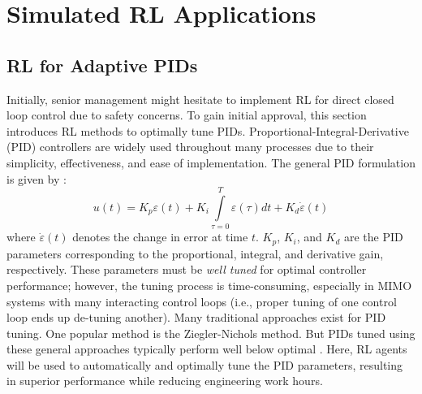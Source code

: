 \section{Simulated RL Applications}
\subsection{RL for Adaptive PIDs}
Initially, senior management might hesitate to implement RL for direct closed loop control due to safety concerns. To gain initial approval, this section introduces RL methods to optimally tune PIDs.  Proportional-Integral-Derivative (PID) controllers are widely used throughout many processes due to their simplicity, effectiveness, and ease of implementation. The general PID formulation is given by \cite{process_control_ref13}:
\begin{equation}
    u(t) = K_p \varepsilon(t) + K_i \int\limits_{\tau = 0}^T \varepsilon(\tau)dt + K_d\dot{\varepsilon}(t)
\end{equation}
where $\dot{\varepsilon}(t)$ denotes the change in error at time $t$. $K_p$, $K_i$, and $K_d$ are the PID parameters corresponding to the proportional, integral, and derivative gain, respectively.  These parameters must be \textit{well tuned} for optimal controller performance; however, the tuning process is time-consuming, especially in MIMO systems with many interacting control loops (i.e., proper tuning of one control loop ends up de-tuning another).  Many traditional approaches exist for PID tuning.  One popular method is the Ziegler-Nichols method. But PIDs tuned using these general approaches typically perform well below optimal \cite{pid1}.  Here, RL agents will be used to automatically and optimally tune the PID parameters, resulting in superior performance while reducing engineering work hours.


